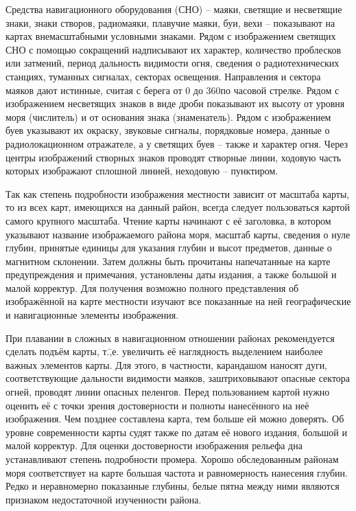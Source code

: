 Средства навигационного оборудования (СНО) \--- маяки, светящие и
несветящие знаки, знаки створов, радиомаяки, плавучие маяки, буи, вехи
\--- показывают на картах внемасштабными условными знаками. Рядом с
изображением светящих СНО с помощью сокращений надписывают их
характер, количество проблесков или затмений, период дальность
видимости огня, сведения о радиотехнических станциях, туманных
сигналах, секторах освещения. Направления и сектора маяков дают
истинные, считая с берега от 0 до 360\gr по часовой стрелке. Рядом с
изображением несветящих знаков в виде дроби показывают их высоту от
уровня моря (числитель) и от основания знака (знаменатель). Рядом с
изображением буев указывают их окраску, звуковые сигналы, порядковые
номера, данные о радиолокационном отражателе, а у светящих буев \---
также и характер огня. Через центры изображений створных знаков
проводят створные линии, ходовую часть которых изображают сплошной
линией, неходовую \--- пунктиром.

Так как степень подробности изображения местности зависит от масштаба
карты, то из всех карт, имеющихся на данный район, всегда следует
пользоваться картой самого крупного масштаба. Чтение карты начинают с
её заголовка, в котором указывают название изображаемого района моря,
масштаб карты, сведения о нуле глубин, принятые единицы для указания
глубин и высот предметов, данные о магнитном склонении. Затем должны
быть прочитаны напечатанные на карте предупреждения и примечания,
установлены даты издания, а также большой и малой корректур. Для
получения возможно полного представления об изображённой на карте
местности изучают все показанные на ней географические и навигационные
элементы изображения.

При плавании в сложных в навигационном отношении районах рекомендуется
сделать подъём карты, т.\=,е. увеличить её
наглядность выделением наиболее важных элементов карты. Для этого, в
частности, карандашом наносят дуги, соответствующие дальности
видимости маяков, заштриховывают опасные сектора огней, проводят линии
опасных пеленгов. Перед пользованием картой нужно оценить её с точки
зрения достоверности и полноты нанесённого на неё изображения. Чем
позднее составлена карта, тем больше ей можно доверять. Об уровне
современности карты судят также по датам её нового издания, большой и
малой корректур. Для оценки достоверности изображения рельефа дна
устанавливают степень подробности промера. Хорошо обследованным
районам моря соответствует на карте большая частота и равномерность
нанесения глубин. Редко и неравномерно показанные глубины, белые пятна
между ними являются признаком недостаточной изученности района.

